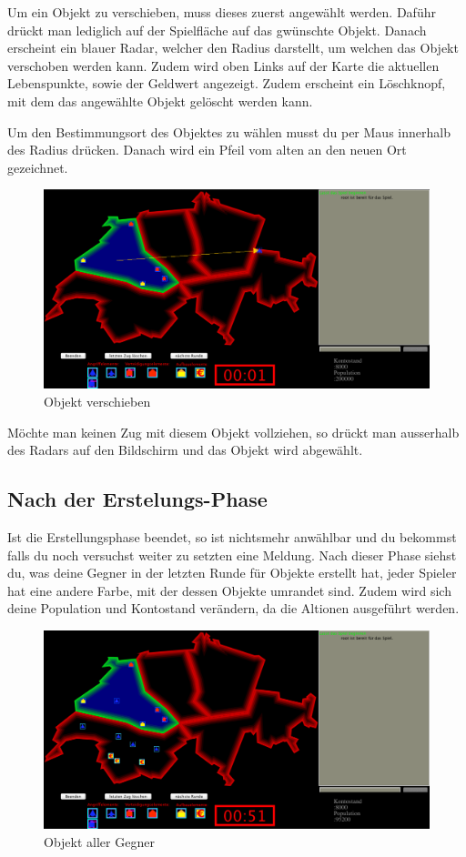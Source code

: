 \documentclass[ngerman, 12pt, pdftex]{scrartcl}[2006/07/30]
\begin{document}
Um ein Objekt zu verschieben, muss dieses zuerst angew\"{a}hlt werden. Daf\"{u}hr drückt man lediglich auf der Spielfläche auf das gwünschte Objekt. Danach erscheint ein blauer Radar, welcher den Radius darstellt, um welchen das Objekt verschoben werden kann. Zudem wird oben Links auf der Karte die aktuellen Lebenspunkte, sowie der Geldwert angezeigt. Zudem erscheint ein Löschknopf, mit dem das angewählte Objekt gelöscht werden kann.

Um den Bestimmungsort des Objektes zu wählen musst du per Maus innerhalb des Radius drücken. Danach wird ein Pfeil vom alten an den neuen Ort gezeichnet.
\begin{figure}[h]
\centering
\includegraphics[scale=0.29]{spiel/Objekt_verschieben.png}
\caption{Objekt verschieben}
\end{figure}

Möchte man keinen Zug mit diesem Objekt vollziehen, so drückt man ausserhalb des Radars auf den Bildschirm und das Objekt wird abgewählt.

\newpage

\subsection{Nach der Erstelungs-Phase}

Ist die Erstellungsphase beendet, so ist nichtsmehr anwählbar und du bekommst falls du noch versuchst weiter zu setzten eine Meldung.
Nach dieser Phase siehst du, was deine Gegner in der letzten Runde für Objekte erstellt hat, jeder Spieler hat eine andere Farbe, mit der dessen Objekte umrandet sind. Zudem wird sich deine Population und Kontostand verändern, da die Altionen ausgeführt werden.

\begin{figure}[h]
\centering
\includegraphics[scale=0.3]{spiel/Objekt_gegner.png}
\caption{Objekt aller Gegner}
\end{figure}
\end{document}
